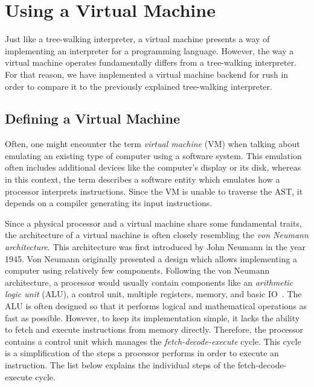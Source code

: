 \section{Using a Virtual Machine}

Just like a tree-walking interpreter, a virtual machine presents a way of implementing an interpreter for a programming language.
However, the way a virtual machine operates fundamentally differs from a tree-walking interpreter.
For that reason, we have implemented a virtual machine backend for rush in order to compare it to the previously explained tree-walking interpreter.

\subsection{Defining a Virtual Machine}

Often, one might encounter the term \emph{virtual machine} (VM) when talking about emulating an existing type of computer using a software system.
This emulation often includes additional devices like the computer's display or its disk,
whereas in this context, the term describes a software entity which emulates how a processor interprets instructions.
Since the VM is unable to traverse the AST, it depends on a compiler generating its input instructions.

Since a physical processor and a virtual machine share some fundamental traits,
the architecture of a virtual machine is often closely resembling the \emph{von Neumann architecture}.
This architecture was first introduced by John Neumann in the year 1945.
Von Neumann originally presented a design which allows implementing a computer using relatively few components.
Following the von Neumann architecture, a processor would usually contain components like an \emph{arithmetic logic unit} (ALU), a control unit, multiple registers, memory, and basic IO~\cite[p.~172]{Ledin2020-yp}.
The ALU is often designed so that it performs logical and mathematical operations as fast as possible.
However, to keep its implementation simple, it lacks the ability to fetch and execute instructions from memory directly.
Therefore, the processor contains a control unit which manages the \emph{fetch-decode-execute} cycle.
This cycle is a simplification of the steps a processor performs in order to execute an instruction.
The list below explains the individual steps of the fetch-decode-execute cycle.

